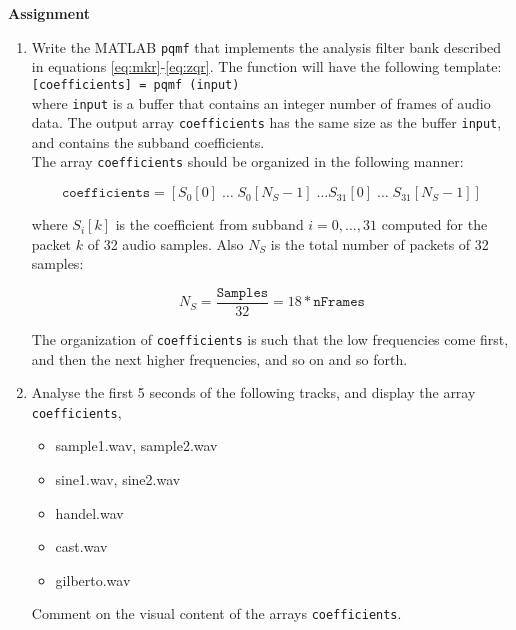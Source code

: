 \documentclass{article} %
\begin{document}
\begin{framed}
\textbf{Assignment}
\begin{enumerate}
\item Write the MATLAB \verb|pqmf| that implements the analysis filter bank
described in equations \ref{eq:mkr}-\ref{eq:zqr}. The function will have the following template:
\\[2ex]
\verb|[coefficients] = pqmf (input)|
\\[2ex]
where \verb|input| is a buffer that contains an integer number of frames
of audio data. The output array \verb|coefficients| has the same
size as the buffer \verb|input|, and contains the subband coefficients. 
\\

The array \verb|coefficients| should be organized in the following manner:

\begin{equation}
\texttt{coefficients} = 
\left[ S_{0}[0] \; \dots \; S_{0}[N_S-1] \; 
\dots S_{31}[0] \; \dots \; S_{31}[N_S-1]\right]
\end{equation}

where $S_i[k]$ is the coefficient from subband $i=0,\dots,31$ computed
for the packet $k$ of 32 audio samples. Also $N_S$ is the total number of
packets of 32 samples:

\begin{equation}
N_S=\frac{\texttt{Samples}}{32}=18*\texttt{nFrames}
\end{equation}

The organization of \verb|coefficients| is such that the low frequencies
come first, and then the next higher frequencies, and so on and so forth. 

\item Analyse the first 5 seconds of the following tracks, and display the
array \verb|coefficients|,

\begin{itemize}
\item sample1.wav, sample2.wav
\item sine1.wav, sine2.wav
\item handel.wav
\item cast.wav
\item gilberto.wav
\end{itemize}

Comment on the visual content of the arrays \verb|coefficients|.
\end{enumerate}
\end{framed}
\end{document}
